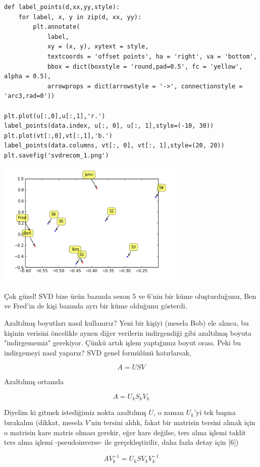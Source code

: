 \documentclass[12pt,fleqn]{article}\usepackage{../../common}
\begin{document}
\begin{verbatim}
def label_points(d,xx,yy,style):
    for label, x, y in zip(d, xx, yy):
        plt.annotate(
            label, 
            xy = (x, y), xytext = style,
            textcoords = 'offset points', ha = 'right', va = 'bottom',
            bbox = dict(boxstyle = 'round,pad=0.5', fc = 'yellow', alpha = 0.5),
            arrowprops = dict(arrowstyle = '->', connectionstyle = 'arc3,rad=0'))

plt.plot(u[:,0],u[:,1],'r.')
label_points(data.index, u[:, 0], u[:, 1],style=(-10, 30))
plt.plot(vt[:,0],vt[:,1],'b.')
label_points(data.columns, vt[:, 0], vt[:, 1],style=(20, 20))
plt.savefig('svdrecom_1.png')
\end{verbatim}

\includegraphics[height=6cm]{svdrecom_1.png}

Çok güzel! SVD bize ürün bazında sezon 5 ve 6'nin bir küme
oluşturduğunu, Ben ve Fred'in de kişi bazında ayrı bir küme olduğunu
gösterdi.

Azaltılmış boyutları nasıl kullanırız? Yeni bir kişiyi (mesela Bob)
ele alınca, bu kişinin verisini öncelikle aynen diğer verilerin
indirgendiği gibi azaltılmış boyuta "indirgememiz" gerekiyor. Çünkü
artık işlem yaptığımız boyut orası. Peki bu indirgemeyi nasıl yaparız?
SVD genel formülünü hatırlarsak,

$$ A = USV $$

Azaltılmış ortamda

$$ A = U_k S_k V_k $$

Diyelim ki gitmek istediğimiz nokta azaltılmış $U$, o zaman $U_k$'yi tek
başına bırakalım (dikkat, mesela $V$'nin tersini aldık, fakat bir matrisin
tersini almak için o matrisin kare matris olması gerekir, eğer kare
değilse, ters alma işlemi taklit ters alma işlemi -pseudoinverse- ile
gerçekleştirilir, daha fazla detay için [6])

$$ A V_k^{-1} = U_k S V_k V_k^{-1} $$
\end{document}

